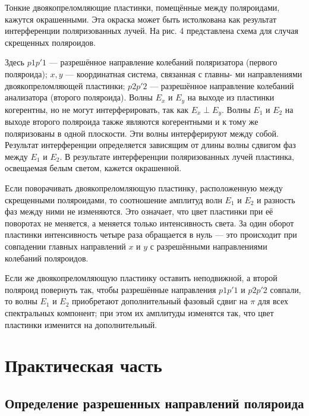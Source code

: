 \documentclass[a4paper, 12pt]{article}
\begin{document}
Тонкие двоякопреломляющие пластинки, помещённые между поляроидами, кажутся окрашенными. Эта окраска может быть истолкована как результат интерференции поляризованных лучей. На рис. 4 представлена схема для
случая скрещенных поляроидов.

Здесь $ p1p'1 $ --- разрешённое направление колебаний поляризатора
(первого поляроида); $ x, y $ --- координатная система, связанная с главны-
ми направлениями двоякопреломляющей пластинки; $ p2p'2 $ --- разрешённое направление колебаний анализатора (второго поляроида). Волны
$ E_x  $ и $ E_y $ на выходе из пластинки когерентны, но не могут интерферировать, так как $ E_x \perp  E_y $. Волны $ E_1 $ и $ E_2 $ на выходе второго поляроида
также являются когерентными и к тому же поляризованы в одной плоскости. Эти волны интерферируют между собой. Результат интерференции определяется зависящим от длины волны сдвигом фаз между $ E_1 $
и $ E_2 $. В результате интерференции поляризованных лучей пластинка, освещаемая белым светом, кажется окрашенной.

Если поворачивать двоякопреломляющую пластинку, расположенную между
скрещенными поляроидами, то соотношение амплитуд волн $ E_1 $ и $ E_2 $ и разность фаз между ними не изменяются. Это означает, что цвет пластинки при её поворотах не меняется, а меняется только интенсивность света. За один оборот пластинки интенсивность четыре раза обращается в нуль --- это происходит при совпадении главных направлений
$ x $ и $ y $ с разрешёнными направлениями колебаний поляроидов.

Если же двоякопреломляющую пластинку оставить неподвижной, а
второй поляроид повернуть так, чтобы разрешённые направления $ p1p'1 $
и $ p2p'2 $ совпали, то волны $ E_1 $ и $ E_2 $ приобретают дополнительный фазовый сдвиг на $ \pi $ для всех спектральных компонент; при этом их амплитуды изменятся так, что цвет пластинки изменится на дополнительный. 



\section{Практическая часть}
\subsection{Определение разрешенных направлений поляроида}
\end{document}
